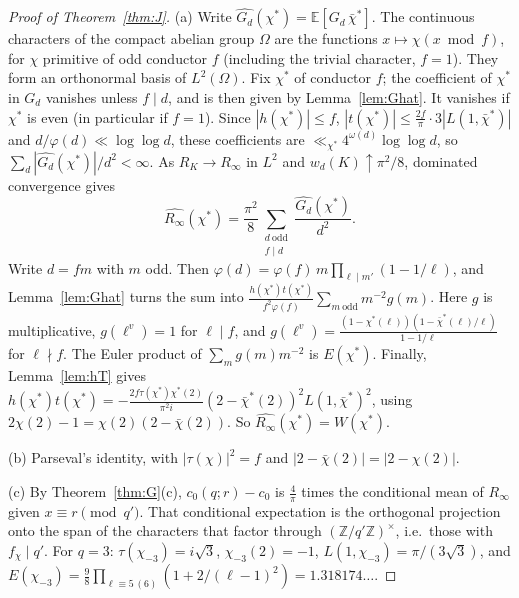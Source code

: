 \documentclass[11pt]{amsart}
\theoremstyle{remark}
\newcommand{\E}{\mathbb{E}}
\newcommand{\Z}{\mathbb{Z}}
\begin{document}
\begin{proof}[Proof of Theorem~\ref{thm:J}]
(a) Write $\widehat{G_d}(\chi^*)=\E[G_d\,\bar\chi^*]$. The continuous characters of the compact abelian group $\Omega$ are the functions $x\mapsto\chi(x\bmod f)$, for $\chi$ primitive of odd conductor $f$ (including the trivial character, $f=1$). They form an orthonormal basis of $L^2(\Omega)$. Fix $\chi^*$ of conductor $f$; the coefficient of $\chi^*$ in $G_d$ vanishes unless $f\mid d$, and is then given by Lemma~\ref{lem:Ghat}. It vanishes if $\chi^*$ is even (in particular if $f=1$). Since $|h(\chi^*)|\le f$, $|t(\chi^*)|\le\frac{2f}\pi\cdot3|L(1,\bar\chi^*)|$ and $d/\varphi(d)\ll\log\log d$, these coefficients are $\ll_{\chi^*}4^{\omega(d)}\log\log d$, so $\sum_d|\widehat{G_d}(\chi^*)|/d^2<\infty$. As $R_K\to R_\infty$ in $L^2$ and $w_d(K)\uparrow\pi^2/8$, dominated convergence gives
\[
\widehat{R_\infty}(\chi^*)=\frac{\pi^2}8\sum_{\substack{d\ \mathrm{odd}\\ f\mid d}}\frac{\widehat{G_d}(\chi^*)}{d^2}.
\]
Write $d=fm$ with $m$ odd. Then $\varphi(d)=\varphi(f)\,m\prod_{\ell\mid m'}(1-1/\ell)$, and Lemma~\ref{lem:Ghat} turns the sum into $\frac{h(\chi^*)t(\chi^*)}{f^2\varphi(f)}\sum_{m\ \mathrm{odd}}m^{-2}g(m)$. Here $g$ is multiplicative, $g(\ell^v)=1$ for $\ell\mid f$, and $g(\ell^v)=\frac{(1-\chi^*(\ell))(1-\bar\chi^*(\ell)/\ell)}{1-1/\ell}$ for $\ell\nmid f$. The Euler product of $\sum_mg(m)m^{-2}$ is $E(\chi^*)$. Finally, Lemma~\ref{lem:hT} gives $h(\chi^*)t(\chi^*)=-\frac{2f\tau(\chi^*)\chi^*(2)}{\pi^2i}(2-\bar\chi^*(2))^2L(1,\bar\chi^*)^2$, using $2\chi(2)-1=\chi(2)(2-\bar\chi(2))$. So $\widehat{R_\infty}(\chi^*)=W(\chi^*)$.

(b) Parseval's identity, with $|\tau(\chi)|^2=f$ and $|2-\bar\chi(2)|=|2-\chi(2)|$.

(c) By Theorem~\ref{thm:G}(c), $c_0(q;r)-c_0$ is $\frac4\pi$ times the conditional mean of $R_\infty$ given $x\equiv r\pmod{q'}$. That conditional expectation is the orthogonal projection onto the span of the characters that factor through $(\Z/q'\Z)^\times$, i.e.\ those with $f_\chi\mid q'$. For $q=3$: $\tau(\chi_{-3})=i\sqrt3$, $\chi_{-3}(2)=-1$, $L(1,\chi_{-3})=\pi/(3\sqrt3)$, and $E(\chi_{-3})=\frac98\prod_{\ell\equiv5\,(6)}(1+2/(\ell-1)^2)=1.318174\ldots$.
\end{proof}
\end{document}
